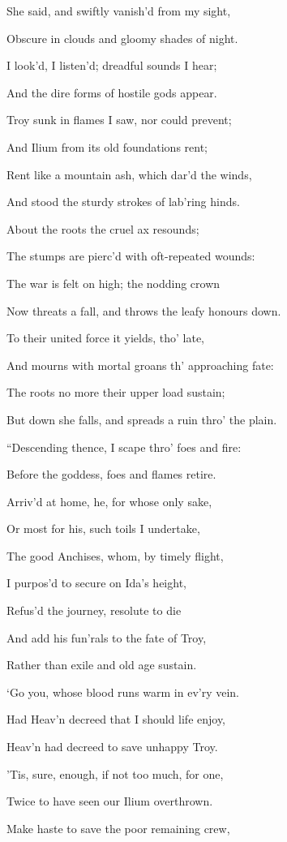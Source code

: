 She said, and swiftly vanish’d from my sight,

Obscure in clouds and gloomy shades of night.

I look’d, I listen’d; dreadful sounds I hear;

And the dire forms of hostile gods appear.

Troy sunk in flames I saw, nor could prevent;

And Ilium from its old foundations rent;

Rent like a mountain ash, which dar’d the winds,

And stood the sturdy strokes of lab’ring hinds.

About the roots the cruel ax resounds;

The stumps are pierc’d with oft-repeated wounds:

The war is felt on high; the nodding crown

Now threats a fall, and throws the leafy honours down.

To their united force it yields, tho’ late,

And mourns with mortal groans th’ approaching fate:

The roots no more their upper load sustain;

But down she falls, and spreads a ruin thro’ the plain.

“Descending thence, I scape thro’ foes and fire:

Before the goddess, foes and flames retire.

Arriv’d at home, he, for whose only sake,

Or most for his, such toils I undertake,

The good Anchises, whom, by timely flight,

I purpos’d to secure on Ida’s height,

Refus’d the journey, resolute to die

And add his fun’rals to the fate of Troy,

Rather than exile and old age sustain.

‘Go you, whose blood runs warm in ev’ry vein.

Had Heav’n decreed that I should life enjoy,

Heav’n had decreed to save unhappy Troy.

’Tis, sure, enough, if not too much, for one,

Twice to have seen our Ilium overthrown.

Make haste to save the poor remaining crew,

